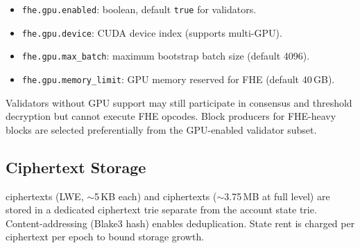 \begin{itemize}
  \item \texttt{fhe.gpu.enabled}: boolean, default \texttt{true} for \TChain{} validators.
  \item \texttt{fhe.gpu.device}: CUDA device index (supports multi-GPU).
  \item \texttt{fhe.gpu.max\_batch}: maximum bootstrap batch size (default 4096).
  \item \texttt{fhe.gpu.memory\_limit}: GPU memory reserved for FHE (default 40\,GB).
\end{itemize}

Validators without GPU support may still participate in consensus and threshold decryption but cannot execute FHE opcodes. Block producers for FHE-heavy blocks are selected preferentially from the GPU-enabled validator subset.

\subsection{Ciphertext Storage}

\TFHE{} ciphertexts (LWE, $\sim$5\,KB each) and \CKKS{} ciphertexts ($\sim$3.75\,MB at full level) are stored in a dedicated ciphertext trie separate from the account state trie. Content-addressing (Blake3 hash) enables deduplication. State rent is charged per ciphertext per epoch to bound storage growth.

